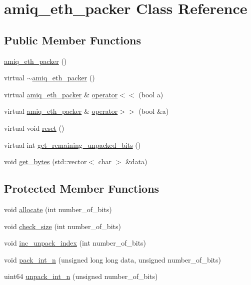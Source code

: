 \hypertarget{classamiq__eth__packer}{
\section{amiq\_\-eth\_\-packer Class Reference}
\label{classamiq__eth__packer}
}
\subsection*{Public Member Functions}
\begin{DoxyCompactItemize}
\item 
\hyperlink{classamiq__eth__packer_ad503914eb2cb923d5ba7b767f88f0b7f}{amiq\_\-eth\_\-packer} ()
\item 
virtual \hyperlink{classamiq__eth__packer_a87fda1fe83328486346166ee2fea0382}{$\sim$amiq\_\-eth\_\-packer} ()
\item 
virtual \hyperlink{classamiq__eth__packer}{amiq\_\-eth\_\-packer} \& \hyperlink{classamiq__eth__packer_adbe11f8c9700a57579712e4ec93f379c}{operator$<$$<$} (bool a)
\item 
virtual \hyperlink{classamiq__eth__packer}{amiq\_\-eth\_\-packer} \& \hyperlink{classamiq__eth__packer_a5ac87df11ad060f344d99c1438ac0d3f}{operator$>$$>$} (bool \&a)
\item 
virtual void \hyperlink{classamiq__eth__packer_a914e685316dcc50d6f722df3f35455c7}{reset} ()
\item 
virtual int \hyperlink{classamiq__eth__packer_a471a75ac1b30c5514c1e3e872cf2cee3}{get\_\-remaining\_\-unpacked\_\-bits} ()
\item 
void \hyperlink{classamiq__eth__packer_a17d66f0e67b9b2d85dfe047363bd7a92}{get\_\-bytes} (std::vector$<$ char $>$ \&data)
\end{DoxyCompactItemize}
\subsection*{Protected Member Functions}
\begin{DoxyCompactItemize}
\item 
void \hyperlink{classamiq__eth__packer_a96f5c9604c2f26808693738fc3ccc559}{allocate} (int number\_\-of\_\-bits)
\item 
void \hyperlink{classamiq__eth__packer_a254b9bc4b64955eab0e05c2ee0e5b71a}{check\_\-size} (int number\_\-of\_\-bits)
\item 
void \hyperlink{classamiq__eth__packer_a9bf86e302dc4da5c4ff9947746a37d10}{inc\_\-unpack\_\-index} (int number\_\-of\_\-bits)
\item 
void \hyperlink{classamiq__eth__packer_a3c0488109ff70104c0daa0ec8b180d15}{pack\_\-int\_\-n} (unsigned long long data, unsigned number\_\-of\_\-bits)
\item 
uint64 \hyperlink{classamiq__eth__packer_aefe67bda34ca7585005e3a0fbfc7f9e1}{unpack\_\-int\_\-n} (unsigned number\_\-of\_\-bits)
\end{DoxyCompactItemize}
